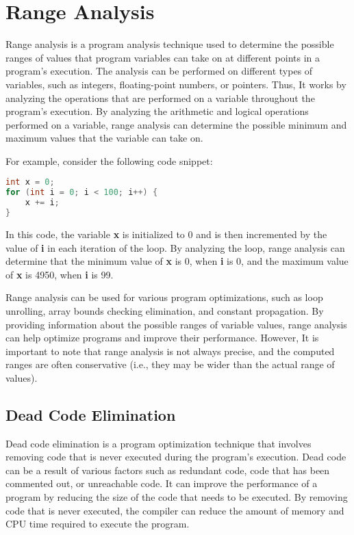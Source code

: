 \chapter{Range Analysis}
\label{ch:range}

Range analysis is a program analysis technique used to determine the possible ranges of values that program variables can take on at different points in a program's execution. The analysis can be performed on different types of variables, such as integers, floating-point numbers, or pointers. Thus, It works by analyzing the operations that are performed on a variable throughout the program's execution. By analyzing the arithmetic and logical operations performed on a variable, range analysis can determine the possible minimum and maximum values that the variable can take on.

For example, consider the following code snippet:

\begin{lstlisting}[language=C++]
int x = 0;
for (int i = 0; i < 100; i++) {
    x += i;
}
\end{lstlisting}

In this code, the variable \textbf{x} is initialized to 0 and is then incremented by the value of \textbf{i} in each iteration of the loop. By analyzing the loop, range analysis can determine that the minimum value of \textbf{x} is 0, when \textbf{i} is 0, and the maximum value of \textbf{x} is 4950, when \textbf{i} is 99.

Range analysis can be used for various program optimizations, such as loop unrolling, array bounds checking elimination, and constant propagation. By providing information about the possible ranges of variable values, range analysis can help optimize programs and improve their performance. However, It is important to note that range analysis is not always precise, and the computed ranges are often conservative (i.e., they may be wider than the actual range of values).

\section{Dead Code Elimination}
\label{sec:dce}

Dead code elimination is a program optimization technique that involves removing code that is never executed during the program's execution. Dead code can be a result of various factors such as redundant code, code that has been commented out, or unreachable code. It can improve the performance of a program by reducing the size of the code that needs to be executed. By removing code that is never executed, the compiler can reduce the amount of memory and CPU time required to execute the program.

